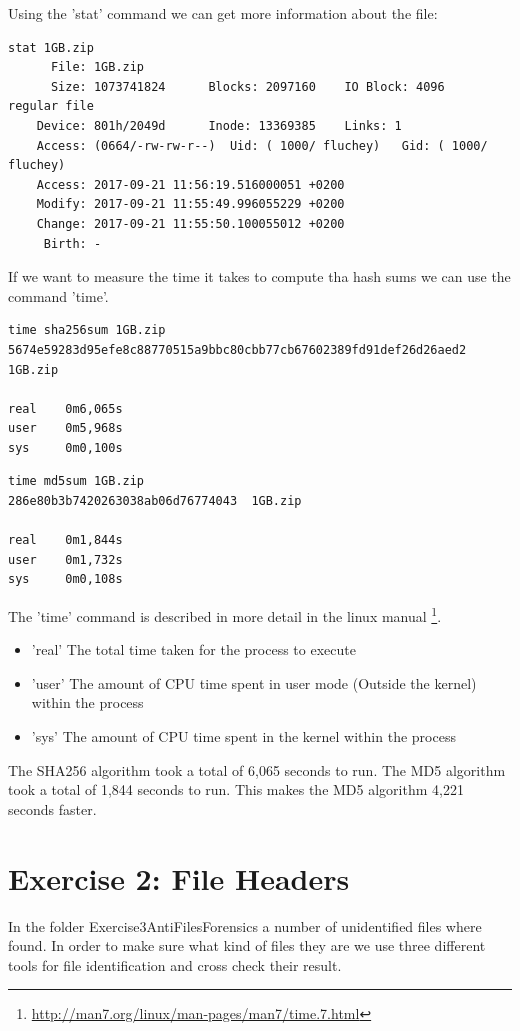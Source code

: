 \documentclass[a4paper,10pt,oneside]{article}
\begin{document}
Using the 'stat' command we can get more information about the file:

\begin{lstlisting}[caption=Result from 'stat' command]
stat 1GB.zip
      File: 1GB.zip
      Size: 1073741824      Blocks: 2097160    IO Block: 4096   regular file
    Device: 801h/2049d      Inode: 13369385    Links: 1
    Access: (0664/-rw-rw-r--)  Uid: ( 1000/ fluchey)   Gid: ( 1000/ fluchey)
    Access: 2017-09-21 11:56:19.516000051 +0200
    Modify: 2017-09-21 11:55:49.996055229 +0200
    Change: 2017-09-21 11:55:50.100055012 +0200
     Birth: -
\end{lstlisting}

If we want to measure the time it takes to compute tha hash sums we can use the command 'time'.

\begin{lstlisting}[caption=Time taken for SHA256]
time sha256sum 1GB.zip
5674e59283d95efe8c88770515a9bbc80cbb77cb67602389fd91def26d26aed2  1GB.zip

real    0m6,065s
user    0m5,968s
sys     0m0,100s
\end{lstlisting}

\begin{lstlisting}[caption=Time taken for MD5]
time md5sum 1GB.zip
286e80b3b7420263038ab06d76774043  1GB.zip

real    0m1,844s
user    0m1,732s
sys     0m0,108s
\end{lstlisting}

The 'time' command is described in more detail in the linux manual \footnote{\url{http://man7.org/linux/man-pages/man7/time.7.html}}.
\begin{itemize}
        \item 'real' The total time taken for the process to execute
        \item 'user' The amount of CPU time spent in user mode (Outside the kernel) within the process
        \item 'sys' The amount of CPU time spent in the kernel within the process
\end{itemize}

The SHA256 algorithm took a total of 6,065 seconds to run. The MD5 algorithm took a total of 1,844 seconds to run. This makes the MD5 algorithm 4,221 seconds faster.


\newpage
\section{Exercise 2: File Headers}
In the folder Exercise3\textunderscore Anti\textunderscore Files\textunderscore Forensics a number of unidentified files where found.
In order to make sure what kind of files they are we use three different tools for file identification and cross check their result.
\end{document}
